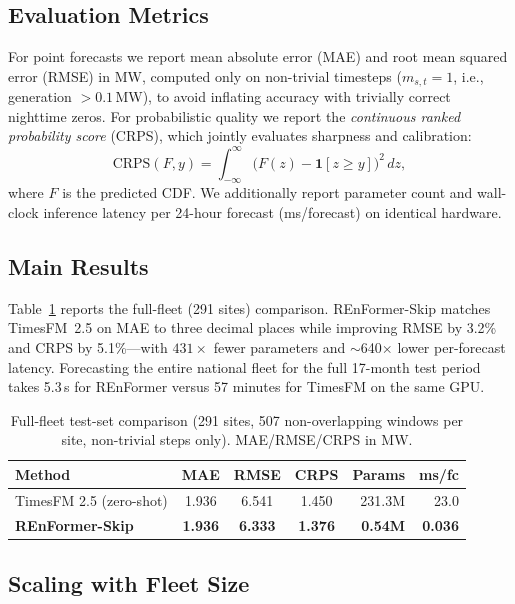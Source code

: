 \documentclass[10pt,twocolumn]{article}
\begin{document}
\subsection{Evaluation Metrics}

For point forecasts we report mean absolute error (MAE) and root mean
squared error (RMSE) in MW, computed only on non-trivial timesteps
($m_{s,t} = 1$, i.e., generation $> 0.1$\,MW), to avoid inflating
accuracy with trivially correct nighttime zeros. For probabilistic
quality we report the \emph{continuous ranked probability score} (CRPS),
which jointly evaluates sharpness and calibration:
\begin{equation}
  \text{CRPS}(F, y) = \int_{-\infty}^{\infty}
  \bigl(F(z) - \mathbf{1}[z \geq y]\bigr)^2 \, dz,
\end{equation}
where $F$ is the predicted CDF. We additionally report parameter count
and wall-clock inference latency per 24-hour forecast (ms/forecast) on
identical hardware.

\subsection{Main Results}

Table~\ref{tab:main_results} reports the full-fleet (291 sites)
comparison. REnFormer-Skip matches TimesFM~2.5 on MAE to three decimal
places while improving RMSE by 3.2\% and CRPS by 5.1\%---with
$431\times$ fewer parameters and $\sim$640$\times$ lower per-forecast
latency. Forecasting the entire national fleet for the full 17-month
test period takes 5.3\,s for REnFormer versus 57 minutes for TimesFM on
the same GPU.

\begin{table}[h]
  \centering
  \caption{Full-fleet test-set comparison (291 sites, 507 non-overlapping
    windows per site, non-trivial steps only). MAE/RMSE/CRPS in MW.}
  \label{tab:main_results}
  \begin{tabular}{lcccrr}
    \toprule
    Method & MAE & RMSE & CRPS & Params & ms/fc \\
    \midrule
    TimesFM 2.5 (zero-shot) & 1.936 & 6.541 & 1.450 & 231.3M & 23.0 \\
    \textbf{REnFormer-Skip} & \textbf{1.936} & \textbf{6.333} &
      \textbf{1.376} & \textbf{0.54M} & \textbf{0.036} \\
    \bottomrule
  \end{tabular}
\end{table}

\subsection{Scaling with Fleet Size}
\end{document}
